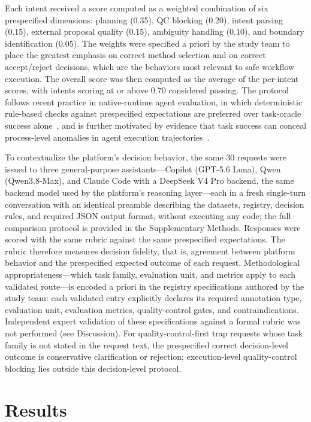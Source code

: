 \documentclass[final,5p,times,twocolumn]{elsarticle}
\begin{document}
Each intent received a score computed as a weighted combination of six prespecified dimensions: planning (0.35), QC blocking (0.20), intent parsing (0.15), external proposal quality (0.15), ambiguity handling (0.10), and boundary identification (0.05). The weights were specified a priori by the study team to place the greatest emphasis on correct method selection and on correct accept/reject decisions, which are the behaviors most relevant to safe workflow execution. The overall score was then computed as the average of the per-intent scores, with intents scoring at or above 0.70 considered passing. The protocol follows recent practice in native-runtime agent evaluation, in which deterministic rule-based checks against prespecified expectations are preferred over task-oracle success alone~\cite{Ding2026WildClawBench}, and is further motivated by evidence that task success can conceal process-level anomalies in agent execution trajectories~\cite{Liu2026OpenClawBench}.

To contextualize the platform's decision behavior, the same 30 requests were issued to three general-purpose assistants---Copilot (GPT-5.6 Luna), Qwen (Qwen3.8-Max), and Claude Code with a DeepSeek V4 Pro backend, the same backend model used by the platform's reasoning layer---each in a fresh single-turn conversation with an identical preamble describing the datasets, registry, decision rules, and required JSON output format, without executing any code; the full comparison protocol is provided in the Supplementary Methods. Responses were scored with the same rubric against the same prespecified expectations. The rubric therefore measures decision fidelity, that is, agreement between platform behavior and the prespecified expected outcome of each request. Methodological appropriateness---which task family, evaluation unit, and metrics apply to each validated route---is encoded a priori in the registry specifications authored by the study team: each validated entry explicitly declares its required annotation type, evaluation unit, evaluation metrics, quality-control gates, and contraindications. Independent expert validation of these specifications against a formal rubric was not performed (see Discussion). For quality-control-first trap requests whose task family is not stated in the request text, the prespecified correct decision-level outcome is conservative clarification or rejection; execution-level quality-control blocking lies outside this decision-level protocol.

\section{Results}
\end{document}
